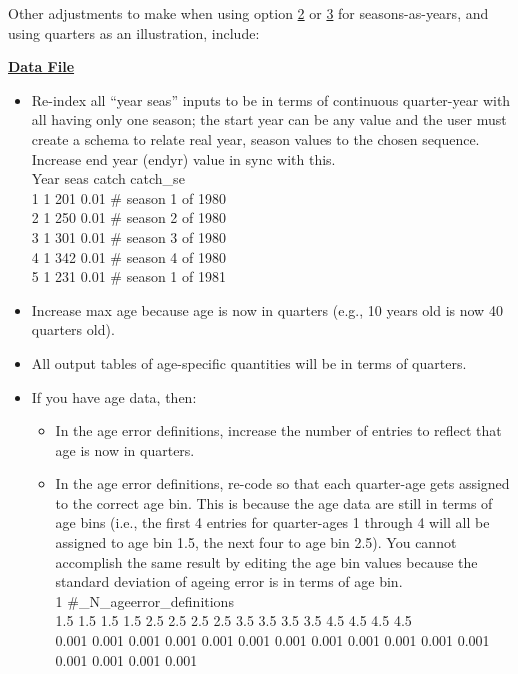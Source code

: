 Other adjustments to make when using option \hyperlink{option2}{2} or \hyperlink{option3}{3} for seasons-as-years, and using quarters as an illustration, include:

\textbf{\underline{Data File}}
\begin{itemize}
	\item Re-index all “year seas” inputs to be in terms of continuous quarter-year with all having only one season; the start year can be any value and the user must create a schema to relate real year, season values to the chosen sequence. Increase end year (endyr) value in sync with this. \\
	Year seas  catch  catch\_se \\
	1    1     201    0.01     \# season 1 of 1980 \\
	2    1     250    0.01     \# season 2 of 1980 \\
	3    1     301    0.01     \# season 3 of 1980 \\
	4    1     342    0.01     \# season 4 of 1980 \\
	5    1     231    0.01     \# season 1 of 1981 \\
	\item Increase max age because age is now in quarters (e.g., 10 years old is now 40 quarters old).
	\item All output tables of age-specific quantities will be in terms of quarters.
	\item If you have age data, then:
	\begin{itemize}
		\item In the age error definitions, increase the number of entries to reflect that age is now in quarters.
		\item In the age error definitions, re-code so that each quarter-age gets assigned to the correct age bin. This is because the age data are still in terms of age bins (i.e., the first 4 entries for quarter-ages 1 through 4 will all be assigned to age bin 1.5, the next four to age bin 2.5). You cannot accomplish the same result by editing the age bin values because the standard deviation of ageing error is in terms of age bin. \\
	    1 \#\_N\_ageerror\_definitions \\
		1.5 1.5 1.5 1.5 2.5 2.5 2.5 2.5 3.5 3.5 3.5 3.5 4.5 4.5 4.5 4.5 \\
		0.001 0.001 0.001 0.001 0.001 0.001 0.001 0.001 0.001 0.001 0.001 0.001 0.001 0.001 0.001 0.001
	\end{itemize}
\end{itemize}

